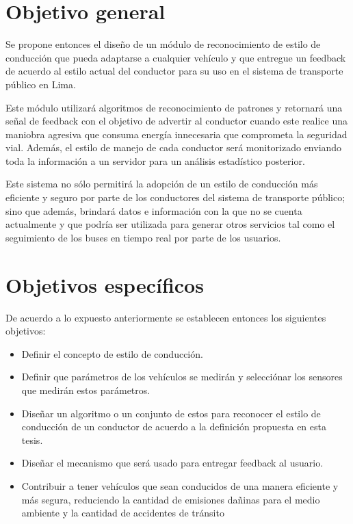 
\section{Objetivo general}
Se propone entonces el diseño de un módulo de reconocimiento de estilo de conducción que pueda adaptarse a cualquier vehículo y que entregue un feedback de acuerdo al estilo actual del conductor para su uso en el sistema de transporte público en Lima.

Este módulo utilizará algoritmos de reconocimiento de patrones y retornará una señal de feedback con el objetivo de advertir al conductor cuando este realice una maniobra agresiva que consuma energía innecesaria que comprometa la seguridad vial. Además, el estilo de manejo de cada conductor será monitorizado enviando toda la información a un servidor para un análisis estadístico posterior.

Este sistema no sólo permitirá la adopción de un estilo de conducción más eficiente y seguro por parte de los conductores del sistema de transporte público; sino que además, brindará datos e información con la que no se cuenta actualmente y que podría ser utilizada para generar otros servicios tal como el seguimiento de los buses en tiempo real por parte de los usuarios.

\section{Objetivos específicos}
De acuerdo a lo expuesto anteriormente se establecen entonces los siguientes objetivos:

\begin{itemize}
    \itemsep0em
    \item Definir el concepto de estilo de conducción.
    \item Definir que parámetros de los vehículos se medirán y selecciónar los sensores que medirán estos parámetros.
    \item Diseñar un algoritmo o un conjunto de estos para reconocer el estilo de conducción de un conductor de acuerdo a la definición propuesta en esta tesis.
    \item Diseñar el mecanismo que será usado para entregar feedback al usuario.
    \item Contribuir a tener vehículos que sean conducidos de una manera eficiente y más segura, reduciendo la cantidad de emisiones dañinas para el medio ambiente y la cantidad de accidentes de tránsito
\end{itemize}
